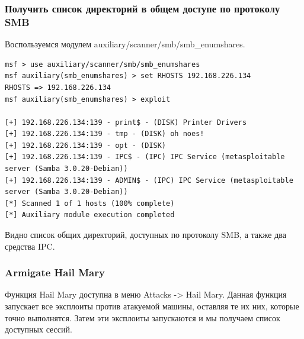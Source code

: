 \documentclass[10pt,a4paper,titlepage]{article}
\begin{document}
\subsubsection{Получить список директорий в общем доступе по протоколу SMB}
Воспользуемся модулем auxiliary/scanner/smb/smb\_enumshares.
\begin{verbatim}
msf > use auxiliary/scanner/smb/smb_enumshares
msf auxiliary(smb_enumshares) > set RHOSTS 192.168.226.134
RHOSTS => 192.168.226.134
msf auxiliary(smb_enumshares) > exploit

[+] 192.168.226.134:139 - print$ - (DISK) Printer Drivers
[+] 192.168.226.134:139 - tmp - (DISK) oh noes!
[+] 192.168.226.134:139 - opt - (DISK) 
[+] 192.168.226.134:139 - IPC$ - (IPC) IPC Service (metasploitable server (Samba 3.0.20-Debian))
[+] 192.168.226.134:139 - ADMIN$ - (IPC) IPC Service (metasploitable server (Samba 3.0.20-Debian))
[*] Scanned 1 of 1 hosts (100% complete)
[*] Auxiliary module execution completed

\end{verbatim}
Видно список общих директорий, доступных по протоколу SMB, а также два средства IPC.

\subsubsection{Armigate Hail Mary}
Функция  Hail Mary доступна в меню Attacks -> Hail Mary. Данная функция запускает все эксплоиты против атакуемой машины, оставляя те их них, которые точно выполнятся. Затем эти эксплоиты запускаются и мы получаем список доступных сессий.
\end{document}
